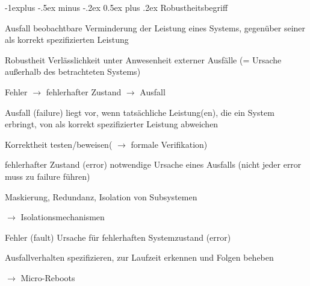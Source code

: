 \documentclass[a4paper]{article}
\makeatletter
\renewcommand{\subsection}{\@startsection{subsection}{2}{0mm}%
 {-1explus -.5ex minus -.2ex}%
 {0.5ex plus .2ex}%
 {\normalfont\normalsize\bfseries}}
\makeatother
\begin{document}
\begin{multicols}{3}
    \subsection{Robustheitsbegriff}
    \begin{description*}
        \item[Ausfall] beobachtbare Verminderung der Leistung eines Systems, gegenüber seiner als korrekt spezifizierten Leistung
        \item[Robustheit] Verlässlichkeit unter Anwesenheit externer Ausfälle (= Ursache außerhalb des betrachteten Systems)
    \end{description*}
    \begin{itemize*}
        \item Fehler $\rightarrow$ fehlerhafter Zustand $\rightarrow$ Ausfall
    \end{itemize*}
    \begin{description*}
        \item[Ausfall] (failure) liegt vor, wenn tatsächliche Leistung(en), die ein System erbringt, von als korrekt spezifizierter Leistung abweichen
        \begin{itemize*}
            \item Korrektheit testen/beweisen( $\rightarrow$ formale Verifikation)
        \end{itemize*}
        \item[fehlerhafter Zustand] (error) notwendige Ursache eines Ausfalls (nicht jeder error muss zu failure führen)
        \begin{itemize*}
            \item Maskierung, Redundanz, Isolation von Subsystemen
            \item[$\rightarrow$] Isolationsmechanismen
        \end{itemize*}
        \item[Fehler] (fault) Ursache für fehlerhaften Systemzustand (error)%
        \begin{itemize*}
            \item Ausfallverhalten spezifizieren, zur Laufzeit erkennen und Folgen beheben%
            \item[$\rightarrow$] Micro-Reboots
        \end{itemize*}
    \end{description*}


\end{multicols}
\end{document}
